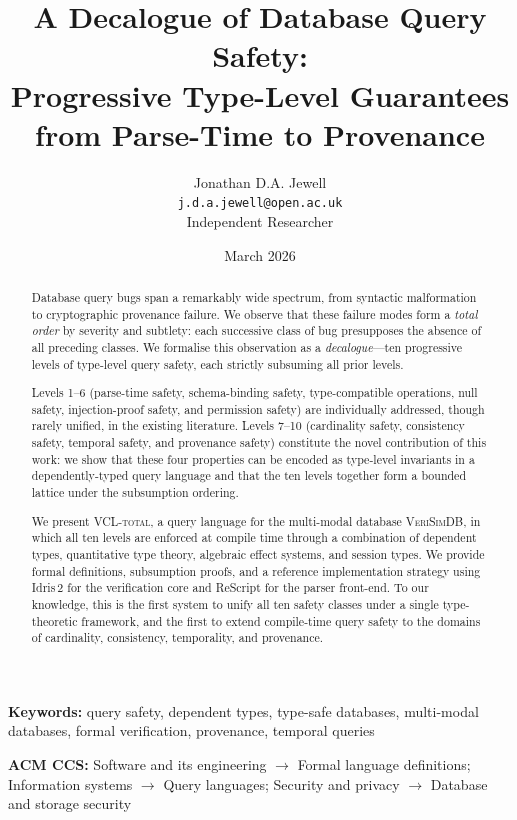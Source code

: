 \documentclass[11pt,a4paper]{article}
\title{%
  \textbf{A Decalogue of Database Query Safety:\\
  Progressive Type-Level Guarantees\\
  from Parse-Time to Provenance}%
}
\author{%
  Jonathan D.A. Jewell\\
  \texttt{j.d.a.jewell@open.ac.uk}\\
  \medskip
  \small{Independent Researcher}
}
\date{March 2026}
\newcommand{\VCL}{\textsc{VCL-total}}
\newcommand{\VeriSimDB}{\textsc{VeriSimDB}}
\begin{document}
\maketitle

\begin{abstract}
Database query bugs span a remarkably wide spectrum, from syntactic
malformation to cryptographic provenance failure.  We observe that these
failure modes form a \emph{total order} by severity and subtlety: each
successive class of bug presupposes the absence of all preceding classes.
We formalise this observation as a \emph{decalogue}---ten progressive
levels of type-level query safety, each strictly subsuming all prior
levels.

Levels 1--6 (parse-time safety, schema-binding safety, type-compatible
operations, null safety, injection-proof safety, and permission safety)
are individually addressed, though rarely unified, in the existing
literature.  Levels 7--10 (cardinality safety, consistency safety,
temporal safety, and provenance safety) constitute the novel contribution
of this work: we show that these four properties can be encoded as
type-level invariants in a dependently-typed query language and that the
ten levels together form a bounded lattice under the subsumption
ordering.

We present \VCL{}, a query language for the multi-modal database
\VeriSimDB{}, in which all ten levels are enforced at compile time
through a combination of dependent types, quantitative type theory,
algebraic effect systems, and session types.  We provide formal
definitions, subsumption proofs, and a reference implementation strategy
using Idris\,2 for the verification core and ReScript for the parser
front-end.  To our knowledge, this is the first system to unify all ten
safety classes under a single type-theoretic framework, and the first to
extend compile-time query safety to the domains of cardinality,
consistency, temporality, and provenance.
\end{abstract}

\noindent
\textbf{Keywords:} query safety, dependent types, type-safe databases,
multi-modal databases, formal verification, provenance, temporal queries

\medskip
\noindent
\textbf{ACM CCS:} Software and its engineering $\to$ Formal language
definitions; Information systems $\to$ Query languages; Security and
privacy $\to$ Database and storage security
\end{document}
